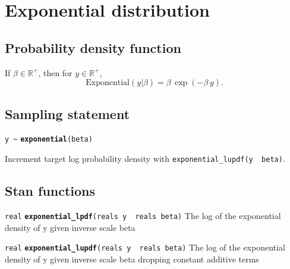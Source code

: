 \documentclass[
  10pt,
]{book}
\begin{document}
\hypertarget{exponential-distribution}{%
\section{Exponential distribution}\label{exponential-distribution}}

\hypertarget{probability-density-function-12}{%
\subsection{Probability density function}\label{probability-density-function-12}}

If \(\beta \in \mathbb{R}^+\), then for \(y \in \mathbb{R}^+\), \[
\text{Exponential}(y|\beta) = \beta \, \exp ( - \beta \, y ) . \]

\hypertarget{sampling-statement-36}{%
\subsection{Sampling statement}\label{sampling-statement-36}}

\texttt{y\ \textasciitilde{}} \textbf{\texttt{exponential}}\texttt{(beta)}

Increment target log probability density with \texttt{exponential\_lupdf(y\ \textbar{}\ beta)}.

\hypertarget{stan-functions-35}{%
\subsection{Stan functions}\label{stan-functions-35}}


\texttt{real} \textbf{\texttt{exponential\_lpdf}}\texttt{(reals\ y\ \textbar{}\ reals\ beta)}\newline
The log of the exponential density of y given inverse scale beta


\texttt{real} \textbf{\texttt{exponential\_lupdf}}\texttt{(reals\ y\ \textbar{}\ reals\ beta)}\newline
The log of the exponential density of y given inverse scale beta
dropping constant additive terms

\end{document}
